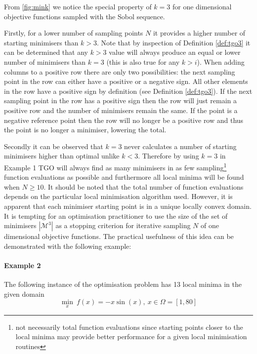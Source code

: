 From \autoref{fig:mink} we notice the special property of $k = 3$ for one dimensional objective functions sampled with the Sobol sequence. 

Firstly, for a lower number of sampling points $N$ it provides a higher number of starting minimisers than $k > 3$. Note that by inspection of Definition \ref{def:tgo3} it can be determined that any $k > 3$ value will always produce an equal or lower number of minimisers than $k = 3$ (this is also true for any $k > i$). When adding columns to a positive row there are only two possibilities: the next sampling point in the row can either have a positive or a negative sign. All other elements in the row have a positive sign by definition (see Definition \ref{def:tgo3}). If the next sampling point in the row has a positive sign then the row will just remain a positive row and the number of minimisers remain the same. If the point is a negative reference point then the row will no longer be a positive row and thus the point is no longer a minimiser, lowering the total.

Secondly it can be observed that $k = 3$ never calculates a number of starting minimisers higher than optimal unlike $k < 3$. Therefore by using $k = 3$ in Example 1 TGO will always find as many minimisers in as few sampling\footnote{not necessarily total function evaluations since starting points closer to the local minima may provide better performance for a given local minimisation routines} function evaluations as possible and furthermore all local minima will be found when $N \ge 10$. It should be noted that the total number of function evaluations depends on the particular local minimisation algorithm used. However, it is apparent that each minimiser starting point is in a unique locally convex domain. It is tempting for an optimisation practitioner to use the size of the set of minimisers $|\mathcal{M}^3|$ as a stopping criterion for iterative sampling $N$ of one dimensional objective functions. The practical usefulness of this idea can be demonstrated with the following example:

\paragraph{Example 2} The following instance of the optimisation problem has 13 local minima in the given domain
\begin{equation} \label{eq:test2}
\underset{x}{\min} ~f(x) = -x \sin(x), ~ x  \in  \Omega = [1, 80]
\end{equation}

